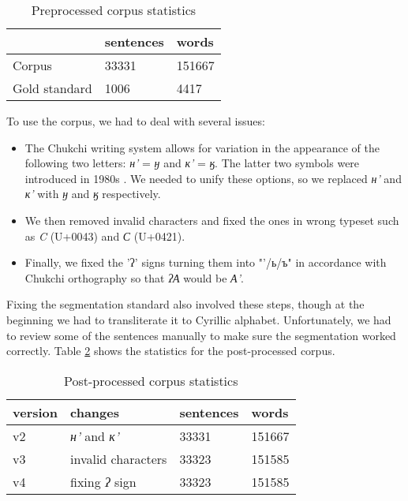 \documentclass[leqno]{article}
\begin{document}
\begin{table}[h]
\centering
\begin{tabular}{|l|l|l|}
\hline
{\color[HTML]{000000} }              & {\color[HTML]{000000} sentences} & {\color[HTML]{000000} words}  \\ \hline
{\color[HTML]{000000} Corpus}        & {\color[HTML]{000000} 33331}     & {\color[HTML]{000000} 151667} \\ \hline
{\color[HTML]{000000} Gold standard} & {\color[HTML]{000000} 1006}      & {\color[HTML]{000000} 4417}   \\ \hline
\end{tabular}
\caption{Preprocessed corpus statistics}
\label{tab:preproc}
\end{table}

To use the corpus, we had to deal with several issues: 
\begin{itemize}
    \item The Chukchi writing system allows for variation in the appearance
    of the following two letters:
    \textit{н'} = \textit{ӈ} and \textit{к'} = \textit{ӄ}. The latter two symbols
    were introduced in 1980s \parencite{chukchiLetters}.
    We needed to unify these options, so we replaced \textit{н'} and
    \textit{к'} with \textit{ӈ} and \textit{ӄ} respectively.
    \item We then removed invalid characters and fixed the ones in wrong
    typeset such as \textit{C} (U+0043) and \textit{С} (U+0421).
    \item Finally, we fixed the 'ʔ' signs turning them into "'/ь/ъ"
    in accordance with Chukchi orthography \parencite[58]{dunn1999grammar} so that \textit{ʔА} would be \textit{А'}.
\end{itemize}

Fixing the segmentation standard also involved these steps, though at the beginning we had to transliterate it to Cyrillic alphabet. Unfortunately, we had to review some of the sentences manually to make sure the segmentation worked correctly. Table \ref{tab:postproc} shows the statistics for the post-processed corpus.
\begin{table}[h]
\centering
\begin{tabular}{|l|l|l|l|}
\hline
{\color[HTML]{000000} version} & {\color[HTML]{000000} changes}              & {\color[HTML]{000000} sentences} & {\color[HTML]{000000} words}  \\ \hline
{\color[HTML]{000000} v2}      & {\color[HTML]{000000} \textit{н'} and \textit{к'}}          & {\color[HTML]{000000} 33331}     & {\color[HTML]{000000} 151667} \\ \hline
{\color[HTML]{000000} v3}      & {\color[HTML]{000000} invalid characters}   & {\color[HTML]{000000} 33323}     & {\color[HTML]{000000} 151585} \\ \hline
{\color[HTML]{000000} v4}      & {\color[HTML]{000000} fixing \textit{ʔ} sign} & {\color[HTML]{000000} 33323}     & {\color[HTML]{000000} 151585} \\ \hline
\end{tabular}
\caption{Post-processed corpus statistics}
\label{tab:postproc}
\end{table}
\end{document}
